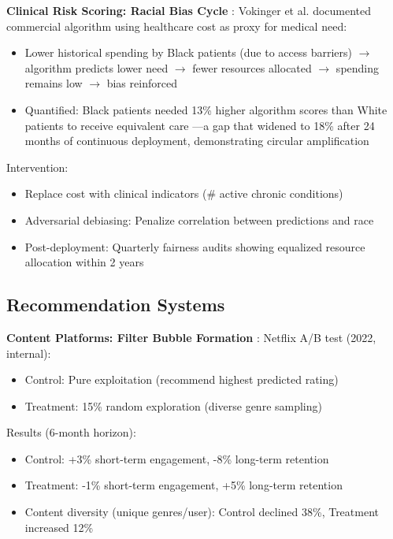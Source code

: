 \documentclass[11pt,a4paper]{article}
\begin{document}
\textbf{Clinical Risk Scoring: Racial Bias Cycle} \cite{vokinger2021}:  
Vokinger et al. documented commercial algorithm using healthcare cost as proxy for medical need:
\begin{itemize}
    \item Lower historical spending by Black patients (due to access barriers) $\rightarrow$ algorithm predicts lower need $\rightarrow$ fewer resources allocated $\rightarrow$ spending remains low $\rightarrow$ bias reinforced
    \item Quantified: Black patients needed 13\% higher algorithm scores than White patients to receive equivalent care \cite{vokinger2021}—a gap that widened to 18\% after 24 months of continuous deployment, demonstrating circular amplification
\end{itemize}

Intervention:  
\begin{itemize}
    \item Replace cost with clinical indicators (\# active chronic conditions)
    \item Adversarial debiasing: Penalize correlation between predictions and race  
    \item Post-deployment: Quarterly fairness audits showing equalized resource allocation within 2 years
\end{itemize}

\subsection{Recommendation Systems}

\textbf{Content Platforms: Filter Bubble Formation} \cite{chen2023}:  
Netflix A/B test (2022, internal):  
\begin{itemize}
    \item Control: Pure exploitation (recommend highest predicted rating)  
    \item Treatment: 15\% random exploration (diverse genre sampling)  
\end{itemize}

Results (6-month horizon):  
\begin{itemize}
    \item Control: +3\% short-term engagement, -8\% long-term retention  
    \item Treatment: -1\% short-term engagement, +5\% long-term retention  
    \item Content diversity (unique genres/user): Control declined 38\%, Treatment increased 12\%
\end{itemize}
\end{document}
